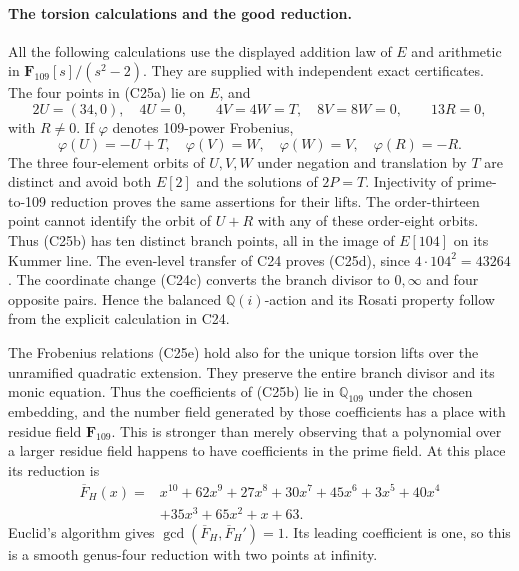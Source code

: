 \documentclass[11pt]{article}
\newcommand{\Q}{\mathbb Q}\newcommand{\C}{\mathbb C}\newcommand{\Z}{\mathbb Z}\newcommand{\R}{\mathbb R}\newcommand{\A}{\mathbb A}\newcommand{\OO}{\mathcal O}
\theoremstyle{definition}\newtheorem{definition}[theorem]{Definition}\newtheorem{remark}[theorem]{Remark}
\begin{document}
\paragraph{The torsion calculations and the good reduction.}
All the following calculations use the displayed addition law
of $E$ and arithmetic in $\mathbf F_{109}[s]/(s^2-2)$.
They are supplied with independent exact certificates.
The four points in (C25a) lie on $E$, and
\[
 2U=(34,0),\quad4U=0,\qquad
 4V=4W=T,\quad8V=8W=0,\qquad13R=0,
\]
with $R\ne0$. If $\varphi$ denotes 109-power Frobenius,
\[
 \varphi(U)=-U+T,\quad
 \varphi(V)=W,\quad\varphi(W)=V,\quad
 \varphi(R)=-R.
 \tag{C25e}
\]
The three four-element orbits of $U,V,W$ under negation
and translation by $T$ are distinct and avoid both
$E[2]$ and the solutions of $2P=T$. Injectivity of
prime-to-109 reduction proves the same assertions for
their lifts. The order-thirteen point cannot identify
the orbit of $U+R$ with any of these order-eight orbits.
Thus (C25b) has ten distinct branch points, all in the
image of $E[104]$ on its Kummer line. The even-level
transfer of C24 proves (C25d), since $4\cdot104^2=43264$.
The coordinate change (C24c) converts the branch divisor
to $0,\infty$ and four opposite pairs. Hence the balanced
$\Q(i)$-action and its Rosati property follow from the
explicit calculation in C24.

The Frobenius relations (C25e) hold also for the unique
torsion lifts over the unramified quadratic extension.
They preserve the entire branch divisor and its monic
equation. Thus the coefficients of (C25b) lie in
$\Q_{109}$ under the chosen embedding, and the number
field generated by those coefficients has a place with
residue field $\mathbf F_{109}$. This is stronger than
merely observing that a polynomial over a larger residue
field happens to have coefficients in the prime field.
At this place its reduction is
\[
\begin{split}
 \overline F_H(x)={}&x^{10}+62x^9+27x^8+30x^7+45x^6
       +3x^5+40x^4\\
       &+35x^3+65x^2+x+63 .
\end{split}
 \tag{C25f}
\]
Euclid's algorithm gives
$\gcd(\overline F_H,\overline F_H')=1$.
Its leading coefficient is one, so this is a smooth
genus-four reduction with two points at infinity.
\end{document}
